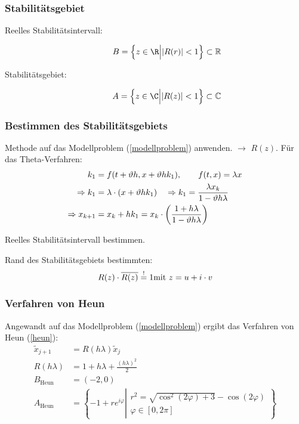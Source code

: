 		\subsubsection{Stabilitätsgebiet}
			\begin{description}
				\item[Reelles Stabilitätsintervall:]
					\[
						B=\left\{ z \in \R \Big\vert |R(r)|<1\right\} \subset \mathbb{R}
					\]
				\item[Stabilitätsgebiet:]
					\[
						A=\left\{ z \in \C \Big\vert |R(z)|<1\right\} \subset \mathbb{C}
					\]
			\end{description}
		\subsubsection{Bestimmen des Stabilitätsgebiets} 
			\begin{tightenumerate}
				\item Methode auf das Modellproblem (\ref{modellproblem}) anwenden. $\rightarrow$ $R(z)$. Für das Theta-Verfahren: 
				\begin{align*}
					k_1 &= f(t+\vartheta h, x + \vartheta h k_1), \qquad f(t,x) = \lambda x \\
					\Rightarrow k_1 &= \lambda \cdot (x + \vartheta h k_1) \quad \Rightarrow \hfill k_1 = \frac{\lambda x_k}{1 - \vartheta h \lambda} \\
					\Rightarrow x_{k+1} &= x_k + hk_1 = x_k \cdot \left( \frac{1 + h\lambda}{1- \vartheta h \lambda}\right)
				\end{align*}
				\item Reelles Stabilitätsintervall bestimmen. 
				\item Rand des Stabilitätsgebiets bestimmten:
				\[ R(z)\cdot\overline{R(z)} \overset{!}{=} 1 \hfill \text{mit } z= u + i \cdot v\]
			\end{tightenumerate}

		\subsubsection{Verfahren von Heun}
			Angewandt auf das Modellproblem (\ref{modellproblem}) ergibt das Verfahren von Heun (\ref{heun}):
			\begin{align*}
				\tilde x_{j+1} &= R(h\lambda)\tilde x_j \\
				R(h\lambda) &= 1 + h\lambda + \frac{(h\lambda)^2}{2} \\
				B_\text{Heun} &= (-2,0) \\
				A_\text{Heun} &= \left\{
					-1 + re^{i\varphi} \left|\begin{array}{l}
						r^2 = \sqrt{\cos^2(2\varphi)+3}-\cos(2\varphi) \\
						\varphi \in [0, 2\pi]
					\end{array}\right.
				\right\}
			\end{align*}

